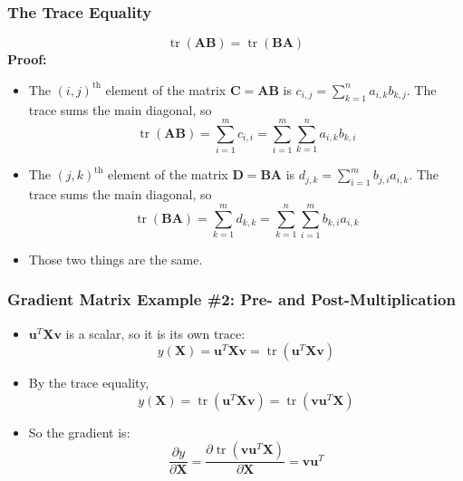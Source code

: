 \documentclass{beamer}
\DeclareMathOperator{\tr}{tr}
\begin{document}
\begin{frame}
  \frametitle{The Trace Equality}
  \begin{displaymath}
    \tr(\mathbf{AB})=\tr(\mathbf{BA})
  \end{displaymath}
  \textbf{Proof:}
  \begin{itemize}
  \item The $(i,j)^{\text{th}}$ element of the matrix
    $\mathbf{C}=\mathbf{A}\mathbf{B}$ is $c_{i,j}=\sum_{k=1}^na_{i,k}b_{k,j}$.
    The trace sums the main diagonal, so
    \begin{displaymath}
      \tr(\mathbf{A}\mathbf{B})=\sum_{i=1}^mc_{i,i}
      =\sum_{i=1}^m\sum_{k=1}^n a_{i,k}b_{k,i}
    \end{displaymath}
  \item The $(j,k)^{\text{th}}$ element of the matrix 
    $\mathbf{D}=\mathbf{B}\mathbf{A}$ is $d_{j,k}=\sum_{i=1}^mb_{j,i}a_{i,k}$.
    The trace sums the main diagonal, so
    \begin{displaymath}
      \tr(\mathbf{B}\mathbf{A})=\sum_{k=1}^md_{k,k}=\sum_{k=1}^n\sum_{i=1}^m b_{k,i}a_{i,k}
    \end{displaymath}
  \item Those two things are the same.
  \end{itemize}
\end{frame}

\begin{frame}
  \frametitle{Gradient Matrix Example \#2: Pre- and Post-Multiplication}
  \begin{itemize}
  \item $\mathbf{u}^T\mathbf{X}\mathbf{v}$ is a scalar, so it is its own trace:
    \begin{displaymath}
      y(\mathbf{X})=\mathbf{u}^T\mathbf{X}\mathbf{v}=
      \tr\left(\mathbf{u}^T\mathbf{X}\mathbf{v}\right)
    \end{displaymath}
  \item By the trace equality,
    \begin{displaymath}
      y(\mathbf{X})=\tr\left(\mathbf{u}^T\mathbf{X}\mathbf{v}\right)=
      \tr\left(\mathbf{v}\mathbf{u}^T\mathbf{X}\right)
    \end{displaymath}
  \item So the gradient is:
    \begin{displaymath}
      \frac{\partial y}{\partial\mathbf{X}}=
      \frac{\partial\tr\left(\mathbf{v}\mathbf{u}^T\mathbf{X}\right)}{\partial\mathbf{X}}
      =
      \mathbf{v}\mathbf{u}^T
    \end{displaymath}
  \end{itemize}
\end{frame}
\end{document}
